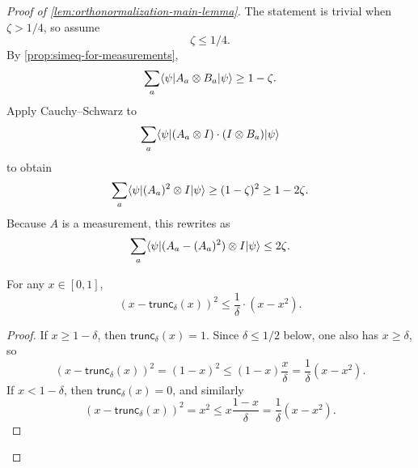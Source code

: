 \begin{proof}[Proof of \ref{lem:orthonormalization-main-lemma}]
	\leanok
	The statement is trivial when $\zeta > 1/4$, so assume
	\begin{equation}\label{eq:assumption-on-zeta}
		\zeta \leq 1/4.
	\end{equation}
	By \ref{prop:simeq-for-measurements},
	\[
		\sum_a \langle \psi \rvert A_a \otimes B_a \lvert \psi \rangle \geq 1-\zeta.
	\]
	Apply Cauchy--Schwarz to
	\[
		\sum_a \langle \psi \rvert (A_a \otimes I)\cdot(I \otimes B_a)\lvert \psi \rangle
	\]
	to obtain
	\[
		\sum_a \langle \psi \rvert (A_a)^2 \otimes I \lvert \psi \rangle \geq (1-\zeta)^2 \geq 1-2\zeta.
	\]
	Because $A$ is a measurement, this rewrites as
	\begin{equation}\label{eq:A-looks-projective}
		\sum_a \langle \psi \rvert (A_a-(A_a)^2) \otimes I \lvert \psi \rangle \leq 2\zeta.
	\end{equation}

	\begin{lemma}\label{lem:trunc-inequality}
		\leanok
		For any $x \in [0, 1]$,
		\begin{equation*}
			(x - \mathsf{trunc}_\delta(x))^2 \leq \frac{1}{\delta} \cdot (x - x^2).
		\end{equation*}
	\end{lemma}
	\begin{proof}
		\leanok
		If $x \geq 1-\delta$, then $\mathsf{trunc}_\delta(x)=1$. Since $\delta \leq 1/2$ below, one also has $x \geq \delta$, so
		\[
			(x-\mathsf{trunc}_\delta(x))^2
			=
			(1-x)^2
			\leq
			(1-x)\frac{x}{\delta}
			=
			\frac{1}{\delta}(x-x^2).
		\]
		If $x < 1-\delta$, then $\mathsf{trunc}_\delta(x)=0$, and similarly
		\[
			(x-\mathsf{trunc}_\delta(x))^2
			=
			x^2
			\leq
			x\frac{1-x}{\delta}
			=
			\frac{1}{\delta}(x-x^2).
		\]
	\end{proof}


\end{proof}
